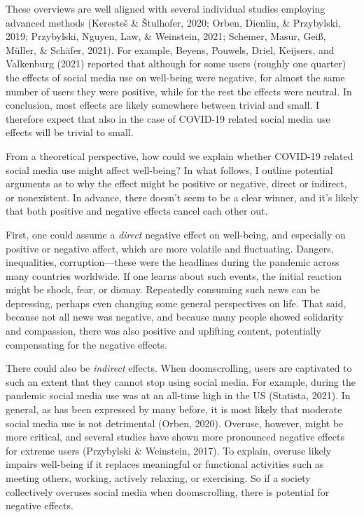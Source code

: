 \documentclass[
  english,
  man,mask,floatsintext]{apa6}
\begin{document}
These overviews are well aligned with several individual studies employing advanced methods (Keresteš \& Štulhofer, 2020; Orben, Dienlin, \& Przybylski, 2019; Przybylski, Nguyen, Law, \& Weinstein, 2021; Schemer, Masur, Geiß, Müller, \& Schäfer, 2021).
For example, Beyens, Pouwels, Driel, Keijsers, and Valkenburg (2021) reported that although for some users (roughly one quarter) the effects of social media use on well-being were negative, for almost the same number of users they were positive, while for the rest the effects were neutral.
In conclusion, most effects are likely somewhere between trivial and small.
I therefore expect that also in the case of COVID-19 related social media use effects will be trivial to small.

From a theoretical perspective, how could we explain whether COVID-19 related social media use might affect well-being?
In what follows, I outline potential arguments as to why the effect might be positive or negative, direct or indirect, or nonexistent.
In advance, there doesn't seem to be a clear winner, and it's likely that both positive and negative effects cancel each other out.

First, one could assume a \emph{direct} negative effect on well-being, and especially on positive or negative affect, which are more volatile and fluctuating.
Dangers, inequalities, corruption---these were the headlines during the pandemic across many countries worldwide.
If one learns about such events, the initial reaction might be shock, fear, or dismay.
Repeatedly consuming such news can be depressing, perhaps even changing some general perspectives on life.
That said, because not all news was negative, and because many people showed solidarity and compassion, there was also positive and uplifting content, potentially compensating for the negative effects.

There could also be \emph{indirect} effects.
When doomscrolling, users are captivated to such an extent that they cannot stop using social media.
For example, during the pandemic social media use was at an all-time high in the US (Statista, 2021).
In general, as has been expressed by many before, it is most likely that moderate social media use is not detrimental (Orben, 2020).
Overuse, however, might be more critical, and several studies have shown more pronounced negative effects for extreme users (Przybylski \& Weinstein, 2017).
To explain, overuse likely impairs well-being if it replaces meaningful or functional activities such as meeting others, working, actively relaxing, or exercising.
So if a society collectively overuses social media when doomscrolling, there is potential for negative effects.
\end{document}
